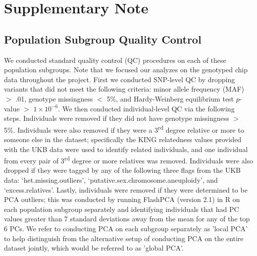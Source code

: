 \documentclass[10pt,a4paper]{article}
\begin{document}



\section{Supplementary Note}\label{Supplementary-Note}

\subsection{Population Subgroup Quality Control}

We conducted standard quality control (QC) procedures on each of these population subgroups. Note that we focused our analyzes on the genotyped chip data throughout the project. First we conducted SNP-level QC by dropping variants that did not meet the following criteria:  minor allele frequency (MAF) $>$ .01, genotype missingness $<$ 5\%, and Hardy-Weinberg equilibrium test $p$-value $>$ $1\times10^{-6}$. We then conducted individual-level QC via the following steps. Individuals were removed if they did not have genotype missingness $>$ 5\%. Individuals were also removed if they were a 3\textsuperscript{rd} degree relative or more to someone else in the dataset; specifically the KING relatedness values provided with the UKB data were used to identify related individuals, and one individual from every pair of 3\textsuperscript{rd} degree or more relatives was removed. Individuals were also dropped if they were tagged by any of the following three flags from the UKB data: `het.missing.outliers', `putative.sex.chromosome.aneuploidy', and `excess.relatives'. Lastly, individuals were removed if they were determined to be PCA outliers; this was conducted by running FlashPCA (version 2.1) \citep{Abraham2017} in R on each population subgroup separately and identifying individuals that had PC values greater than 7 standard deviations away from the mean for any of the top 6 PCs. We refer to conducting PCA on each subgroup separately as 'local PCA' to help distinguish from the alternative setup of conducting PCA on the entire dataset jointly, which would be referred to as 'global PCA'. 
\end{document}
